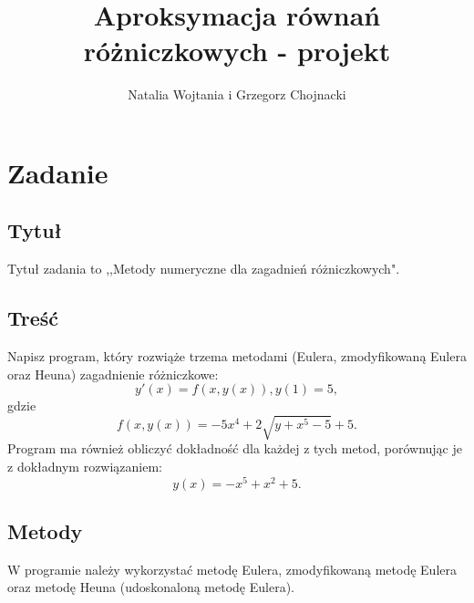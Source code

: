 \documentclass[12pt]{article}
\title{Aproksymacja równań różniczkowych - projekt}
\author{Natalia Wojtania i Grzegorz Chojnacki}
\begin{document}
\maketitle

\section{Zadanie}
\subsection{Tytuł}
Tytuł zadania to ,,Metody numeryczne dla zagadnień różniczkowych".
\subsection{Treść}
Napisz program, który rozwiąże trzema metodami (Eulera, zmodyfikowaną Eulera oraz Heuna) zagadnienie różniczkowe: $$y'(x)= f(x,y(x)), y(1)=5,$$ gdzie $$ f(x,y(x))=-5x^4+2 \sqrt{y+x^5-5}+5.$$
Program ma również obliczyć dokładność dla każdej z tych metod, porównując je z dokładnym rozwiązaniem:$$ y(x)=-x^5+x^2+5.$$
\subsection{Metody}
W programie należy wykorzystać metodę Eulera, zmodyfikowaną metodę Eulera oraz metodę Heuna (udoskonaloną metodę Eulera).
\end{document}
